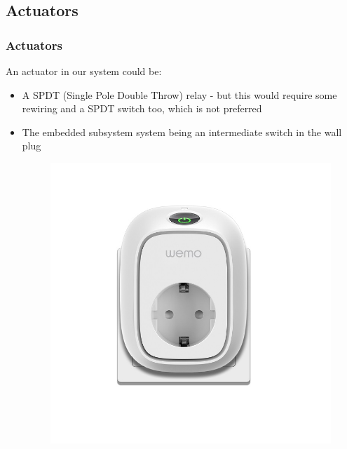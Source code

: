 \subsection{Actuators}
\begin{frame}
	\frametitle{Actuators}
	An actuator in our system could be:
	\begin{itemize}
		\item A SPDT (Single Pole Double Throw) relay - but this would require some rewiring and a SPDT switch too, which is not preferred
		\item The embedded subsystem system being an intermediate switch in the wall plug
		\begin{figure}[htbp]
		    \centering
        \includegraphics[width=\textwidth/2]{Images/wemo.jpeg}
		\end{figure}
	\end{itemize}
\end{frame}
